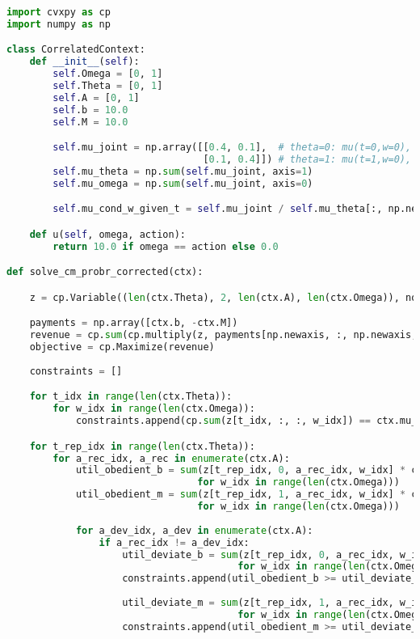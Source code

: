 \begin{lstlisting}[language=Python,style=pythonstyle]
import cvxpy as cp
import numpy as np

class CorrelatedContext:
    def __init__(self):
        self.Omega = [0, 1]
        self.Theta = [0, 1]
        self.A = [0, 1]
        self.b = 10.0  
        self.M = 10.0  

        self.mu_joint = np.array([[0.4, 0.1],  # theta=0: mu(t=0,w=0), mu(t=0,w=1)
                                  [0.1, 0.4]]) # theta=1: mu(t=1,w=0), mu(t=1,w=1)
        self.mu_theta = np.sum(self.mu_joint, axis=1) 
        self.mu_omega = np.sum(self.mu_joint, axis=0) 

        self.mu_cond_w_given_t = self.mu_joint / self.mu_theta[:, np.newaxis]

    def u(self, omega, action):
        return 10.0 if omega == action else 0.0

def solve_cm_probr_corrected(ctx):

    z = cp.Variable((len(ctx.Theta), 2, len(ctx.A), len(ctx.Omega)), nonneg=True)

    payments = np.array([ctx.b, -ctx.M])
    revenue = cp.sum(cp.multiply(z, payments[np.newaxis, :, np.newaxis, np.newaxis]))
    objective = cp.Maximize(revenue)
    
    constraints = []

    for t_idx in range(len(ctx.Theta)):
        for w_idx in range(len(ctx.Omega)):
            constraints.append(cp.sum(z[t_idx, :, :, w_idx]) == ctx.mu_joint[t_idx, w_idx])

    for t_rep_idx in range(len(ctx.Theta)):
        for a_rec_idx, a_rec in enumerate(ctx.A):
            util_obedient_b = sum(z[t_rep_idx, 0, a_rec_idx, w_idx] * ctx.u(ctx.Omega[w_idx], a_rec) 
                                 for w_idx in range(len(ctx.Omega)))
            util_obedient_m = sum(z[t_rep_idx, 1, a_rec_idx, w_idx] * ctx.u(ctx.Omega[w_idx], a_rec) 
                                 for w_idx in range(len(ctx.Omega)))
            
            for a_dev_idx, a_dev in enumerate(ctx.A):
                if a_rec_idx != a_dev_idx:
                    util_deviate_b = sum(z[t_rep_idx, 0, a_rec_idx, w_idx] * ctx.u(ctx.Omega[w_idx], a_dev) 
                                        for w_idx in range(len(ctx.Omega)))
                    constraints.append(util_obedient_b >= util_deviate_b)
                    
                    util_deviate_m = sum(z[t_rep_idx, 1, a_rec_idx, w_idx] * ctx.u(ctx.Omega[w_idx], a_dev) 
                                        for w_idx in range(len(ctx.Omega)))
                    constraints.append(util_obedient_m >= util_deviate_m)


\end{lstlisting}
